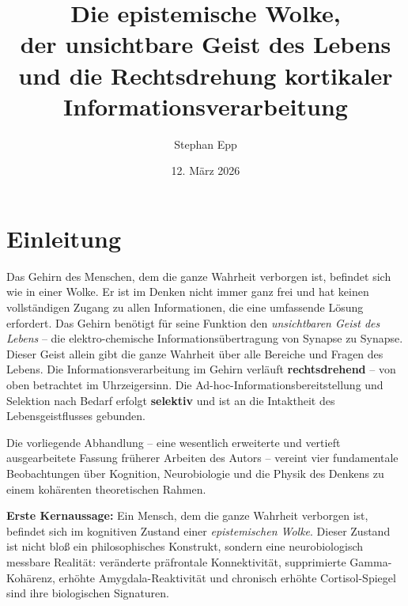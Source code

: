 ﻿\documentclass[12pt,a4paper]{report}
\title{\textbf{Die epistemische Wolke,\\ der unsichtbare Geist des Lebens\\ und die Rechtsdrehung kortikaler Informationsverarbeitung}}
\author{Stephan Epp}
\date{12. März 2026}
\theoremstyle{plain}
\theoremstyle{definition}
\theoremstyle{remark}
\begin{document}
	\maketitle	
	\tableofcontents
	\newpage
	
	\chapter{Einleitung}
	Das Gehirn des Menschen, dem die ganze Wahrheit verborgen ist,
	befindet sich wie in einer Wolke. Er ist im Denken nicht immer
	ganz frei und hat keinen vollständigen Zugang zu allen Informationen,
	die eine umfassende Lösung erfordert. Das Gehirn benötigt für seine Funktion den \emph{unsichtbaren
		Geist des Lebens} -- die elektro-chemische Informationsübertragung
	von Synapse zu Synapse. Dieser Geist allein gibt die ganze Wahrheit über alle Bereiche und Fragen des Lebens.
	Die Informationsverarbeitung im Gehirn verläuft
	\textbf{rechtsdrehend} -- von oben betrachtet im Uhrzeigersinn. Die Ad-hoc-Informationsbereitstellung und Selektion nach Bedarf
	erfolgt \textbf{selektiv} und ist an die Intaktheit des
	Lebensgeistflusses gebunden.
	
	Die vorliegende Abhandlung -- eine wesentlich erweiterte und vertieft
	ausgearbeitete Fassung früherer Arbeiten des Autors -- vereint vier
	fundamentale Beobachtungen über Kognition, Neurobiologie und die
	Physik des Denkens zu einem kohärenten theoretischen Rahmen.
	
	\textbf{Erste Kernaussage:} Ein Mensch, dem die ganze Wahrheit verborgen
	ist, befindet sich im kognitiven Zustand einer \emph{epistemischen Wolke}.
	Dieser Zustand ist nicht blo\ss{} ein philosophisches Konstrukt, sondern
	eine neurobiologisch messbare Realität: veränderte präfrontale
	Konnektivität, supprimierte Gamma-Kohärenz, erhöhte Amygdala-Reaktivität
	und chronisch erhöhte Cortisol-Spiegel sind ihre biologischen Signaturen.
	
\end{document}
